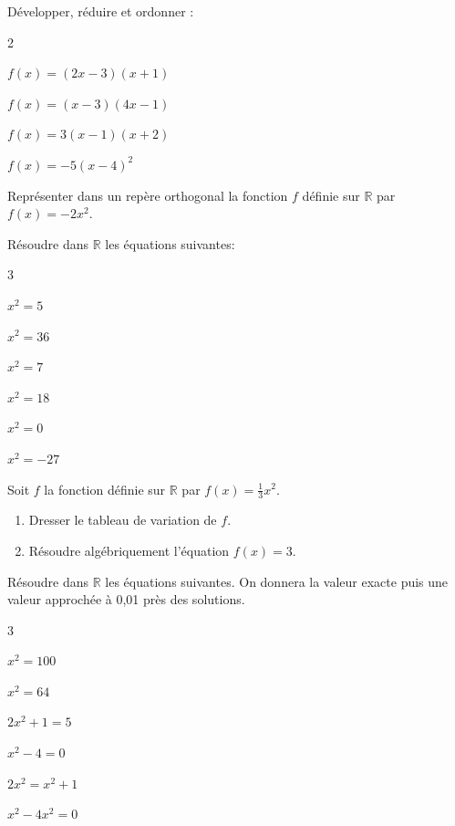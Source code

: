 \documentclass[french]{book}
\begin{document}
\begin{exocor}
Développer, réduire et ordonner :
\begin{enumerate}
\begin{multicols}{2}
\item  $f(x)=(2x-3)(x+1)$
\item  $f(x)=(x-3)(4 x-1)$
\item  $f(x)=3(x-1)(x+2)$
\item $f(x)=-5(x-4)^{2}$
\end{multicols}
\end{enumerate}
\end{exocor}

\begin{exocor}
Représenter dans un repère orthogonal la fonction $f$ définie sur $\mathbb{R}$ par $f(x)=-2 x^{2}$.
\end{exocor}


\begin{exocor}
Résoudre dans $\mathbb{R}$ les équations suivantes:

\begin{enumerate}
\begin{multicols}{3}
\item  $x^{2}=5$
\item  $x^{2}=36$
\item  $x^{2}=7$
\item  $x^{2}=18$
\item  $x^{2}=0$
\item  $x^{2}=-27$
\end{multicols}
\end{enumerate}
\end{exocor}



\begin{exocor}
Soit $f$ la fonction définie sur $\mathbb{R}$ par $f(x)=\frac{1}{3} x^{2}$.

\begin{enumerate}
\item Dresser le tableau de variation de $f$.
\item Résoudre algébriquement l'équation $f(x)=3$.
\end{enumerate}
\end{exocor}

\begin{exocor}
Résoudre dans $\mathbb{R}$ les équations suivantes. On donnera la valeur exacte puis une valeur approchée à 0,01 près des solutions.

\begin{enumerate}
\begin{multicols}{3}
\item $x^{2}=100$
\item $x^{2}=64$
\item $2 x^{2}+1=5$
\item $x^{2}-4=0$
\item $2 x^{2}=x^{2}+1$
\item $x^{2}-4 x^{2}=0$
\end{multicols}
\end{enumerate}
\end{exocor}
\end{document}
